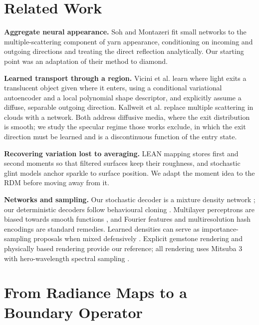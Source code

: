 \documentclass[conference]{IEEEtran}
\begin{document}
\section{Related Work}

\textbf{Aggregate neural appearance.} Soh and Montazeri \cite{soh2024} fit small
networks to the multiple-scattering component of yarn appearance, conditioning on
incoming and outgoing directions and treating the direct reflection
analytically. Our starting point was an adaptation of their method to diamond.

\textbf{Learned transport through a region.} Vicini et al. \cite{vicini2019}
learn where light exits a translucent object given where it enters, using a
conditional variational autoencoder and a local polynomial shape descriptor, and
explicitly assume a diffuse, separable outgoing direction. Kallweit et al.
\cite{kallweit2017} replace multiple scattering in clouds with a network. Both
address diffusive media, where the exit distribution is smooth; we study the
specular regime those works exclude, in which the exit direction must be learned
and is a discontinuous function of the entry state.

\textbf{Recovering variation lost to averaging.} LEAN mapping \cite{olano2010}
stores first and second moments so that filtered surfaces keep their roughness,
and stochastic glint models \cite{jakob2014glints} anchor sparkle to surface
position. We adapt the moment idea to the RDM before moving away from it.

\textbf{Networks and sampling.} Our stochastic decoder is a mixture density
network \cite{bishop1994}; our deterministic decoders follow behavioural cloning
\cite{pomerleau1989}. Multilayer perceptrons are biased towards smooth functions
\cite{rahaman2019}, and Fourier features \cite{tancik2020} and multiresolution
hash encodings \cite{muller2022ngp} are standard remedies. Learned densities can
serve as importance-sampling proposals \cite{muller2019nis} when mixed
defensively \cite{hesterberg1995,veach1995}. Explicit gemstone rendering
\cite{sun2000} and physically based rendering \cite{pharr2023} provide our
reference; all rendering uses Mitsuba 3 \cite{mitsuba3} with hero-wavelength
spectral sampling \cite{wilkie2014}.

\section{From Radiance Maps to a Boundary Operator}
\label{sec:evolution}
\end{document}
